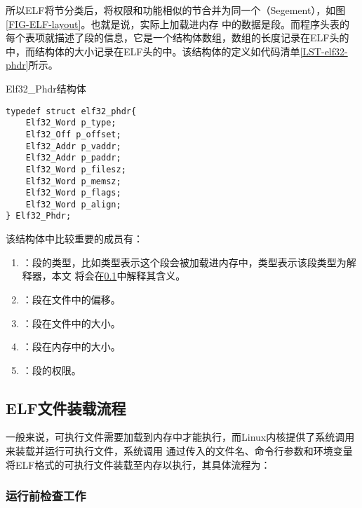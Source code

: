 所以ELF将节分类后，将权限和功能相似的节合并为同一个（Segement），如图\ref{FIG-ELF-layout}。也就是说，实际上加载进内存
中的数据是段。而程序头表的每个表项就描述了段的信息，它是一个结构体数组，数组的长度记录在ELF头的
中，而结构体的大小记录在ELF头的中。该结构体的定义如代码清单\ref{LST-elf32-phdr}所示。

\begin{listing}
\caption{Elf32\_Phdr结构体}
\label{LST-elf32-phdr}
\begin{verbatim}
typedef struct elf32_phdr{
    Elf32_Word p_type;
    Elf32_Off p_offset;
    Elf32_Addr p_vaddr;
    Elf32_Addr p_paddr;
    Elf32_Word p_filesz;
    Elf32_Word p_memsz;
    Elf32_Word p_flags;
    Elf32_Word p_align;
} Elf32_Phdr;
\end{verbatim}
\end{listing}

该结构体中比较重要的成员有：
\begin{enumerate}
    \item {}：段的类型，比如类型表示这个段会被加载进内存中，类型表示该段类型为解释器，本文
        将会在\ref{SEC-ELF-Loading}中解释其含义。
    \item {}：段在文件中的偏移。
    \item {}：段在文件中的大小。
    \item {}：段在内存中的大小。
    \item {}：段的权限。
\end{enumerate}

\subsection{ELF文件装载流程}
\label{SEC-ELF-Loading}

一般来说，可执行文件需要加载到内存中才能执行，而Linux内核提供了系统调用来装载并运行可执行文件，系统调用
通过传入的文件名、命令行参数和环境变量将ELF格式的可执行文件装载至内存以执行，其具体流程为：

\subsubsection{运行前检查工作}

